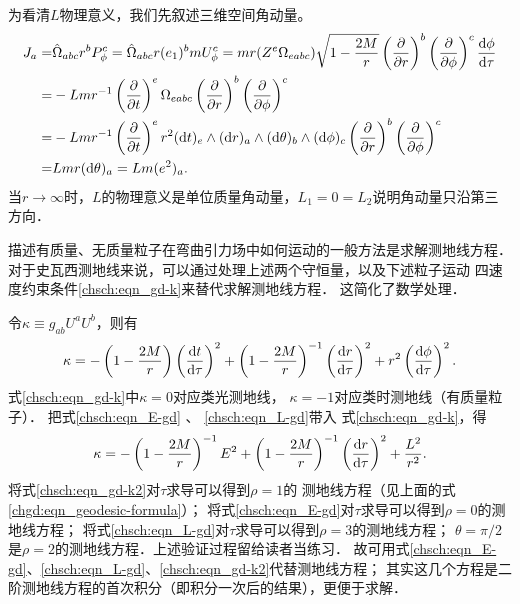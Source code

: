 为看清$L$物理意义，我们先叙述三维空间角动量。
\begin{align*}
	J_a =& \hat{\Omega}_{abc} r^b P^c_{\phi} = \hat{\Omega}_{abc} r (e_1)^b  m U^c_{\phi}
	= mr (Z^e\Omega_{eabc})  \sqrt{1-\frac{2M}{r}} \left( \frac{\partial }{\partial r} \right)^b  
	\left( \frac{\partial }{\partial \phi} \right)^c \frac{{\rm d}\phi }{{\rm d} \tau}  \\
	=&-L m r^{-1}  \left( \frac{\partial }{\partial t} \right)^e \Omega_{eabc}
	\left( \frac{\partial }{\partial r} \right)^b \left( \frac{\partial }{\partial \phi} \right)^c \\
	=& -L m r^{-1}  \left( \frac{\partial }{\partial t} \right)^e r^2 ({\rm d}t)_e\wedge 
	({\rm d}r)_a \wedge ({\rm d}\theta)_b\wedge ({\rm d}\phi)_c  
	\left( \frac{\partial }{\partial r} \right)^b \left( \frac{\partial }{\partial \phi} \right)^c \\
	=& L m  r ({\rm d}\theta)_a = Lm (e^2)_a .
\end{align*}
当$r\to \infty$时，$L$的物理意义是单位质量角动量，$L_1=0=L_2$说明角动量只沿第三方向．


描述有质量、无质量粒子在弯曲引力场中如何运动的一般方法是求解测地线方程．
对于史瓦西测地线来说，可以通过处理上述两个守恒量，以及下述粒子运动
四速度约束条件\eqref{chsch:eqn_gd-k}来替代求解测地线方程．
这简化了数学处理．



令$\kappa \equiv  g_{ab} U^a U^b$，则有
\begin{equation}\label{chsch:eqn_gd-k}
    \kappa =
    - \left(1-\frac{2M}{r}\right) \left( \frac{{\rm d}t}{{\rm d} \tau}\right)^2
    + \left(1-\frac{2M}{r}\right)^{-1} \left( \frac{{\rm d}r}{{\rm d} \tau}\right)^2
    + r^2 \left( \frac{{\rm d}\phi}{{\rm d} \tau}\right)^2 .
\end{equation}
式\eqref{chsch:eqn_gd-k}中$\kappa=0$对应类光测地线，
$\kappa=-1$对应类时测地线（有质量粒子）．
把式\eqref{chsch:eqn_E-gd} 、 \eqref{chsch:eqn_L-gd}带入
式\eqref{chsch:eqn_gd-k}，得
\begin{align}
    \kappa 
    = - \left(1-\frac{2M}{r}\right)^{-1} E^2
    + \left(1-\frac{2M}{r}\right)^{-1} \left( \frac{{\rm d}r}{{\rm d} \tau}\right)^2
    + \frac{L^2}{r^2} . \label{chsch:eqn_gd-k2}
\end{align}
将式\eqref{chsch:eqn_gd-k2}对$\tau$求导可以得到$\rho=1$的
测地线方程（见上面的式\eqref{chgd:eqn_geodesic-formula}）；
将式\eqref{chsch:eqn_E-gd}对$\tau$求导可以得到$\rho=0$的测地线方程；
将式\eqref{chsch:eqn_L-gd}对$\tau$求导可以得到$\rho=3$的测地线方程；
$\theta=\pi/2$是$\rho=2$的测地线方程．上述验证过程留给读者当练习．
故可用式\eqref{chsch:eqn_E-gd}、\eqref{chsch:eqn_L-gd}、\eqref{chsch:eqn_gd-k2}代替测地线方程；
其实这几个方程是二阶测地线方程的首次积分（即积分一次后的结果），更便于求解．


